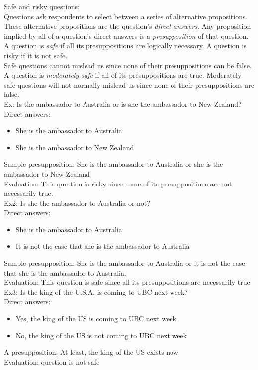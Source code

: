 Safe and risky questions:\\
Questions ask respondents to select between a series of alternative propositions. These alternative propositions are the question's \textit{direct answers}. Any proposition implied by all of a question's direct answers is a \textit{presupposition} of that question. A question is \textit{safe} if all its presuppositions are logically necessary. A question is risky if it is not safe.\\
Safe questions cannot mislead us since none of their presuppositions can be false. A question is \textit{moderately safe} if all of its presuppositions are true. Moderately safe questions will not normally mislead us since none of their presuppositions are false.\\

Ex: Is the ambassador to Australia or is she the ambassador to New Zealand?\\
Direct answers:
\begin{itemize}
    \item She is the ambassador to Australia
    \item She is the ambassador to New Zealand
\end{itemize}
Sample presupposition: She is the ambassador to Australia or she is the ambassador to New Zealand\\
Evaluation: This question is risky since some of its presuppositions are not necessarily true.\\

Ex2: Is she the ambassador to Australia or not?\\
Direct answers:
\begin{itemize}
    \item She is the ambassador to Australia
    \item It is not the case that she is the ambassador to Australia
\end{itemize}
Sample presupposition: She is the ambassador to Australia or it is not the case that she is the ambassador to Australia.\\
Evaluation: This question is safe since all its presuppositions are necessarily true\\

Ex3: Is the king of the U.S.A. is coming to UBC next week?\\
Direct answers:
\begin{itemize}
    \item Yes, the king of the US is coming to UBC next week
    \item No, the king of the US is not coming to UBC next week
\end{itemize}
A presupposition: At least, the king of the US exists now\\
Evaluation: question is not safe\\

